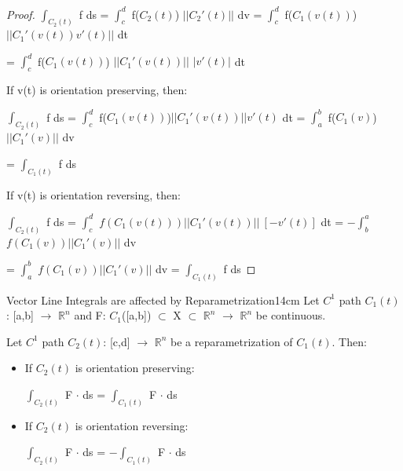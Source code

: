     \begin{proof}
        $\int_{C_2(t)}$ f ds
        = $\int_c^d$ f($C_2(t)$) $||C_2'(t)||$ dv
        = $\int_c^d$ f($C_1(v(t))$) $||C_1'(v(t)) v'(t)||$ dt

        \hspace{1.7cm}
        = $\int_c^d$ f($C_1(v(t))$) $||C_1'(v(t))||$ $|v'(t)|$ dt

        If v(t) is orientation preserving, then:

        \hspace{0.5cm}
        $\int_{C_2(t)}$ f ds
        = $\int_c^d$ f($C_1(v(t))$)$||C_1'(v(t))|| v'(t)$ dt
        = $\int_a^b$ f($C_1(v)$)$||C_1'(v)||$ dv

        \hspace{2.35cm}
        = $\int_{C_1(t)}$ f ds

        If v(t) is orientation reversing, then:

        \hspace{0.5cm}
        $\int_{C_2(t)}$ f ds
        = $\int_c^d$ $f(C_1(v(t)))||C_1'(v(t))|| \ [-v'(t)]$ dt
        = $- \int_b^a$ $f(C_1(v))||C_1'(v)||$ dv

        \hspace{2.35cm}
        = $\int_a^b$ $f(C_1(v))||C_1'(v)||$ dv
        = $\int_{C_1(t)}$ f ds
    \end{proof}

    \vspace{0.5cm}



    \begin{wtheorem}{Vector Line Integrals are affected by Reparametrization}{14cm}
        Let $C^1$ path $C_1(t)$: [a,b] $\rightarrow$ $\mathbb{R}^n$
        and F: $C_1$([a,b]) $\subset$ X $\subset$ $\mathbb{R}^n$ $\rightarrow$
        $\mathbb{R}^n$ be continuous.

        Let $C^1$ path $C_2(t)$: [c,d] $\rightarrow$ $\mathbb{R}^n$
        be a reparametrization of $C_1(t)$. Then:

        \begin{itemize}[itemsep=0.1cm]
            \item If $C_2(t)$ is orientation preserving:
            
                \hspace{0.5cm}
                $\int_{C_2(t)}$ F $\cdot$ ds = $\int_{C_1(t)}$ F $\cdot$ ds
            
            \item If $C_2(t)$ is orientation reversing:
            
                \hspace{0.5cm}
                $\int_{C_2(t)}$ F $\cdot$ ds = $-\int_{C_1(t)}$ F $\cdot$ ds
        \end{itemize}
    \end{wtheorem}

